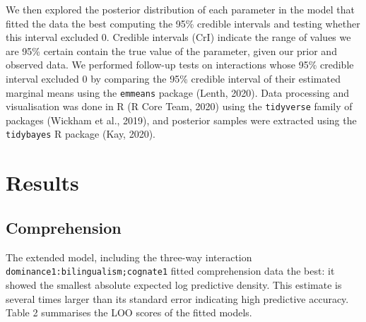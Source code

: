 \documentclass[
  english,
  man,man,floatsintext]{apa6}
\begin{document}
We then explored the posterior distribution of each parameter in the model that fitted the data the best computing the 95\% credible intervals and testing whether this interval excluded 0. Credible intervals (CrI) indicate the range of values we are 95\% certain contain the true value of the parameter, given our prior and observed data. We performed follow-up tests on interactions whose 95\% credible interval excluded 0 by comparing the 95\% credible interval of their estimated marginal means using the \texttt{emmeans} package (Lenth, 2020). Data processing and visualisation was done in R (R Core Team, 2020) using the \texttt{tidyverse} family of packages (Wickham et al., 2019), and posterior samples were extracted using the \texttt{tidybayes} R package (Kay, 2020).

\hypertarget{results}{%
\section{Results}\label{results}}

\hypertarget{comprehension}{%
\subsection{Comprehension}\label{comprehension}}

The extended model, including the three-way interaction \texttt{dominance1:bilingualism;cognate1} fitted comprehension data the best: it showed the smallest absolute expected log predictive density. This estimate is several times larger than its standard error indicating high predictive accuracy. Table 2 summarises the LOO scores of the fitted models.
\end{document}
